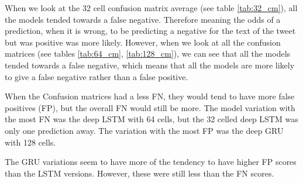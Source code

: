 \documentclass[a4paper,10pt]{article}
\newcommand\MyBox[2]{
	\fbox{\lower0.6cm
		\vbox to 0.6cm{\vfil
			\hbox to 0.9cm{\hfil\parbox{1.0cm}{#1\\#2}\hfil}
			\vfil}%
	}%
}
\begin{document}
	When we look at the 32 cell confusion matrix average (see table \ref{tab:32_cm}), all the models tended towards a false negative. Therefore meaning the odds of a prediction, when it is wrong, to be predicting a negative for the text of the tweet but was positive was more likely. However, when we look at all the confusion matrices (see tables \ref{tab:64_cm}, \ref{tab:128_cm}), we can see that all the models tended towards a false negative, which means that all the models are more likely to give a false negative rather than a false positive. 
	

	


	

	When the Confusion matrices had a less FN, they would tend to have more false positives (FP), but the overall FN would still be more. The model variation with the most FN was the deep LSTM with 64 cells, but the 32 celled deep LSTM was only one prediction away. The variation with the most FP was the deep GRU with 128 cells.
	
	The GRU variations seem to have more of the tendency to have higher FP scores than the LSTM versions. However, these were still less than the FN scores.    

\end{document}
